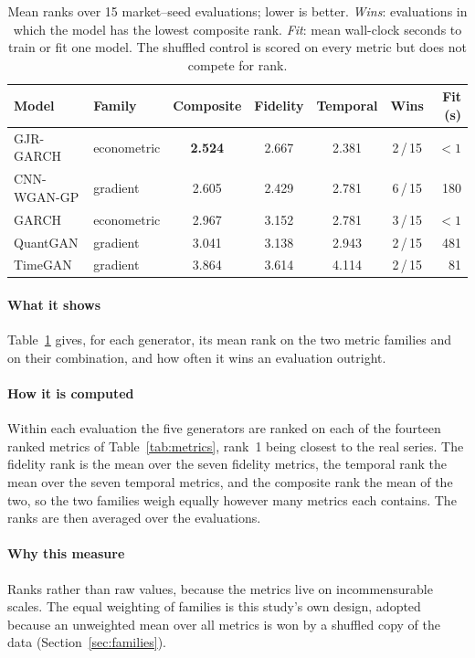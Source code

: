 \documentclass[11pt,a4paper]{article}
\makeatletter
\DeclareRobustCommand{\_}{\ifmmode\nfss@text{\textunderscore}\else\textunderscore\allowbreak\fi}
\makeatother
\begin{document}
\begin{table}[htbp]
\centering
\caption{Mean ranks over 15 market--seed evaluations; lower is better. \emph{Wins}: evaluations in which the model has the lowest composite rank. \emph{Fit}: mean wall-clock seconds to train or fit one model. The shuffled control is scored on every metric but does not compete for rank.}
\label{tab:ranking}
\begin{tabular}{@{}llccccr@{}}
\toprule
Model & Family & Composite & Fidelity & Temporal & Wins & Fit (s) \\
\midrule
GJR-GARCH & econometric & \textbf{2.524} & 2.667 & 2.381 & 2\,/\,15 & $<1$ \\
CNN-WGAN-GP & gradient & 2.605 & 2.429 & 2.781 & 6\,/\,15 & 180 \\
GARCH & econometric & 2.967 & 3.152 & 2.781 & 3\,/\,15 & $<1$ \\
QuantGAN & gradient & 3.041 & 3.138 & 2.943 & 2\,/\,15 & 481 \\
TimeGAN & gradient & 3.864 & 3.614 & 4.114 & 2\,/\,15 & 81 \\
\bottomrule
\end{tabular}
\end{table}

\paragraph{What it shows} Table~\ref{tab:ranking} gives, for each generator, its mean rank on the two metric families and on their combination, and how often it wins an evaluation outright.

\paragraph{How it is computed} Within each evaluation the five generators are ranked on each of the fourteen ranked metrics of Table~\ref{tab:metrics}, rank~1 being closest to the real series. The fidelity rank is the mean over the seven fidelity metrics, the temporal rank the mean over the seven temporal metrics, and the composite rank the mean of the two, so the two families weigh equally however many metrics each contains. The ranks are then averaged over the evaluations.

\paragraph{Why this measure} Ranks rather than raw values, because the metrics live on incommensurable scales. The equal weighting of families is this study's own design, adopted because an unweighted mean over all metrics is won by a shuffled copy of the data (Section~\ref{sec:families}).
\end{document}
